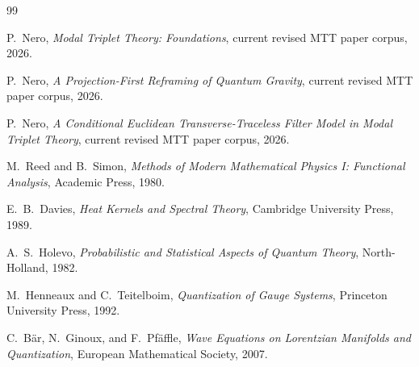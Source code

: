 \documentclass[11pt]{article}
\theoremstyle{definition}
\theoremstyle{remark}
\begin{document}
\begin{thebibliography}{99}

P.~Nero,
\emph{Modal Triplet Theory: Foundations},
current revised MTT paper corpus, 2026.

P.~Nero,
\emph{A Projection-First Reframing of Quantum Gravity},
current revised MTT paper corpus, 2026.

P.~Nero,
\emph{A Conditional Euclidean Transverse-Traceless Filter Model in Modal
Triplet Theory},
current revised MTT paper corpus, 2026.

M.~Reed and B.~Simon,
\emph{Methods of Modern Mathematical Physics I: Functional Analysis},
Academic Press, 1980.

E.~B.~Davies,
\emph{Heat Kernels and Spectral Theory},
Cambridge University Press, 1989.

A.~S.~Holevo,
\emph{Probabilistic and Statistical Aspects of Quantum Theory},
North-Holland, 1982.

M.~Henneaux and C.~Teitelboim,
\emph{Quantization of Gauge Systems},
Princeton University Press, 1992.

C.~B\"ar, N.~Ginoux, and F.~Pf\"affle,
\emph{Wave Equations on Lorentzian Manifolds and Quantization},
European Mathematical Society, 2007.

\end{thebibliography}
\end{document}
